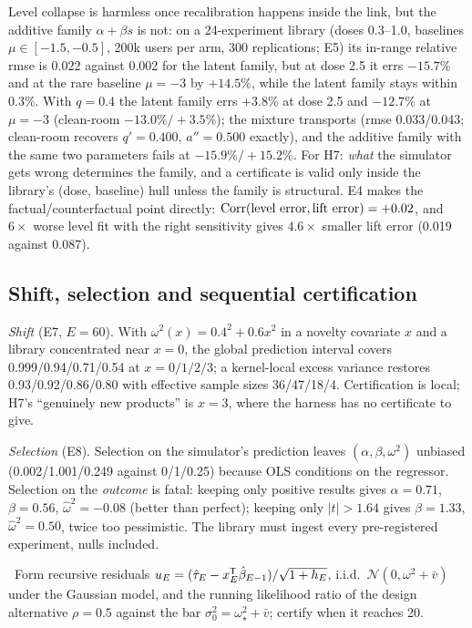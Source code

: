 Level collapse is harmless once recalibration happens inside the link, but the additive family $\alpha + \beta s$ is not: on a 24-experiment library (doses 0.3--1.0, baselines $\mu \in [-1.5, -0.5]$, 200k users per arm, 300 replications; E5) its in-range relative rmse is 0.022 against 0.002 for the latent family, but at dose 2.5 it errs $-15.7\%$ and at the rare baseline $\mu = -3$ by $+14.5\%$, while the latent family stays within 0.3\%. With $q = 0.4$ the latent family errs $+3.8\%$ at dose 2.5 and $-12.7\%$ at $\mu = -3$ (clean-room $-13.0\%/+3.5\%$); the mixture transports (rmse 0.033/0.043; clean-room recovers $q' = 0.400$, $a'' = 0.500$ exactly), and the additive family with the same two parameters fails at $-15.9\%/+15.2\%$. For H7: \emph{what} the simulator gets wrong determines the family, and a certificate is valid only inside the library's (dose, baseline) hull unless the family is structural. E4 makes the factual/counterfactual point directly: $\operatorname{Corr}(\text{level error}, \text{lift error}) = +0.02$, and $6\times$ worse level fit with the right sensitivity gives $4.6\times$ smaller lift error (0.019 against 0.087).

\subsection{Shift, selection and sequential certification}

\emph{Shift} (E7, $E = 60$). With $\omega^2(x) = 0.4^2 + 0.6x^2$ in a novelty covariate $x$ and a library concentrated near $x = 0$, the global prediction interval covers 0.999/0.94/0.71/0.54 at $x = 0/1/2/3$; a kernel-local excess variance restores 0.93/0.92/0.86/0.80 with effective sample sizes 36/47/18/4. Certification is local; H7's ``genuinely new products'' is $x = 3$, where the harness has no certificate to give.

\emph{Selection} (E8). Selection on the simulator's prediction leaves $(\alpha, \beta, \omega^2)$ unbiased (0.002/1.001/0.249 against 0/1/0.25) because OLS conditions on the regressor. Selection on the \emph{outcome} is fatal: keeping only positive results gives $\alpha = 0.71$, $\beta = 0.56$, $\hat\omega^2 = -0.08$ (better than perfect); keeping only $|t| > 1.64$ gives $\beta = 1.33$, $\hat\omega^2 = 0.50$, twice too pessimistic. The library must ingest every pre-registered experiment, nulls included.

\begin{construction}
\label{sim:con:eprocess}
\tagEstablished\ Form recursive residuals $u_E = (\hat\tau_E - x_E^{\mathsf{T}}\hat\beta_{E-1})/\sqrt{1 + h_E}$, i.i.d.\ $\mathcal N(0, \omega^2 + \bar v)$ under the Gaussian model, and the running likelihood ratio of the design alternative $\rho = 0.5$ against the bar $\sigma_0^2 = \omega_\star^2 + \bar v$; certify when it reaches 20.
\end{construction}

